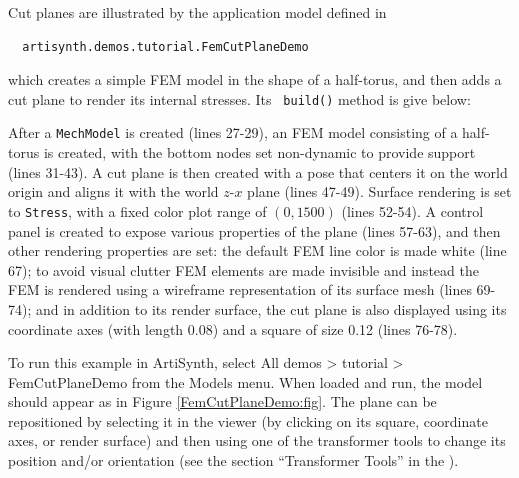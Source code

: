 Cut planes are illustrated by the application model defined in
%
\begin{verbatim}
  artisynth.demos.tutorial.FemCutPlaneDemo
\end{verbatim}
%
which creates a simple FEM model in the shape of a half-torus, and
then adds a cut plane to render its internal stresses. Its {\tt
build()} method is give below:
%
\lstset{numbers=left} 
\iflatexml

\else

\fi
\lstset{numbers=none}
%
After a {\tt MechModel} is created (lines 27-29), an FEM model
consisting of a half-torus is created, with the bottom nodes set
non-dynamic to provide support (lines 31-43). A cut plane is then
created with a pose that centers it on the world origin and aligns it
with the world $z$-$x$ plane (lines 47-49). Surface rendering is set
to {\tt Stress}, with a fixed color plot range of $(0, 1500)$ (lines
52-54). A control panel is created to expose various properties of the
plane (lines 57-63), and then other rendering properties are set: the
default FEM line color is made white (line 67); to avoid visual
clutter FEM elements are made invisible and instead the FEM is
rendered using a wireframe representation of its surface mesh (lines
69-74); and in addition to its render surface, the cut plane is also
displayed using its coordinate axes (with length 0.08) and a square of
size 0.12 (lines 76-78).

To run this example in ArtiSynth, select {\sf All demos > tutorial >
FemCutPlaneDemo} from the {\sf Models} menu. When loaded and run, the
model should appear as in Figure \ref{FemCutPlaneDemo:fig}. The plane
can be repositioned by selecting it in the viewer (by clicking on its
square, coordinate axes, or render surface) and then using one of the
transformer tools to change its position and/or orientation (see the
section ``Transformer Tools'' in the
).

\ifdefined\maindoc
\else

\fi

